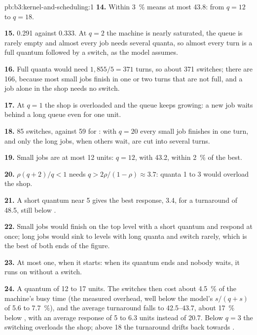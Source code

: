 \begin{solution}{pb:b3:kernel-and-scheduling:1}
\textbf{14.} Within 3~\% means at most 43.8: from $q = 12$ to $q = 18$.

\textbf{15.} 0.291 against 0.333. At $q = 2$ the machine is nearly saturated, the queue is rarely empty and almost every job needs several quanta, so almost every turn is a full quantum followed by a switch, as the model assumes.

\textbf{16.} Full quanta would need $1{,}855/5 = 371$ turns, so about 371 switches; there are 166, because most small jobs finish in one or two turns that are not full, and a job alone in the shop needs no switch.

\textbf{17.} At $q = 1$ the shop is overloaded and the queue keeps growing: a new job waits behind a long queue even for one unit.

\textbf{18.} 85 switches, against 59 for : with $q = 20$ every small job finishes in one turn, and only the long jobs, when others wait, are cut into several turns.

\textbf{19.} Small jobs are at most 12 units: $q = 12$, with 43.2, within 2~\% of the best.

\textbf{20.} $\rho(q + 2)/q < 1$ needs $q > 2\rho/(1 - \rho) \approx 3.7$: quanta 1 to 3 would overload the shop.

\textbf{21.} A short quantum near 5 gives the best response, 3.4, for a turnaround of 48.5, still below .

\textbf{22.} Small jobs would finish on the top level with a short quantum and respond at once; long jobs would sink to levels with long quanta and switch rarely, which is the best of both ends of the figure.

\textbf{23.} At most one, when it starts: when its quantum ends and nobody waits, it runs on without a switch.

\textbf{24.} A quantum of 12 to 17 units. The switches then cost about 4.5~\% of the machine's busy time (the measured overhead, well below the model's $s/(q + s)$ of 5.6 to 7.7~\%), and the average turnaround falls to 42.5--43.7, about 17~\% below , with an average response of 5 to 6.3 units instead of 20.7. Below $q = 3$ the switching overloads the shop; above 18 the turnaround drifts back towards .
\end{solution}
